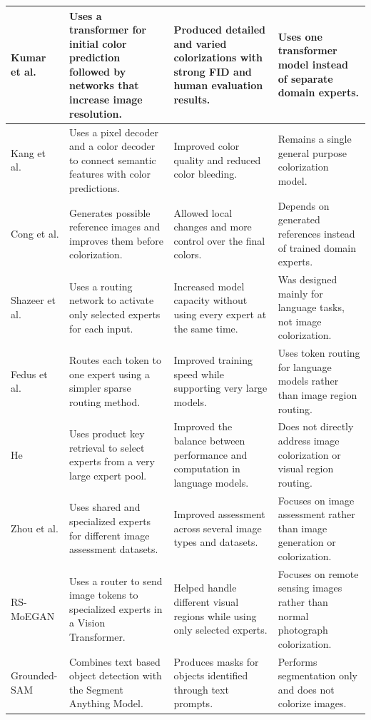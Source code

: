 \documentclass{FastFyp}
\begin{document}
\begin{longtable}{|p{2.5cm}|p{4.2cm}|p{4.2cm}|p{3.8cm}|}
\hline
Kumar et al. \cite{ref5} & Uses a transformer for initial color prediction followed by networks that increase image resolution. & Produced detailed and varied colorizations with strong FID and human evaluation results. & Uses one transformer model instead of separate domain experts. \\
\hline
Kang et al. \cite{ref9} & Uses a pixel decoder and a color decoder to connect semantic features with color predictions. & Improved color quality and reduced color bleeding. & Remains a single general purpose colorization model. \\
\hline
Cong et al. \cite{ref11} & Generates possible reference images and improves them before colorization. & Allowed local changes and more control over the final colors. & Depends on generated references instead of trained domain experts. \\
\hline
Shazeer et al. \cite{ref12} & Uses a routing network to activate only selected experts for each input. & Increased model capacity without using every expert at the same time. & Was designed mainly for language tasks, not image colorization. \\
\hline
Fedus et al. \cite{ref13} & Routes each token to one expert using a simpler sparse routing method. & Improved training speed while supporting very large models. & Uses token routing for language models rather than image region routing. \\
\hline
He \cite{ref14} & Uses product key retrieval to select experts from a very large expert pool. & Improved the balance between performance and computation in language models. & Does not directly address image colorization or visual region routing. \\
\hline
Zhou et al. \cite{ref15} & Uses shared and specialized experts for different image assessment datasets. & Improved assessment across several image types and datasets. & Focuses on image assessment rather than image generation or colorization. \\
\hline
RS-MoEGAN \cite{ref16} & Uses a router to send image tokens to specialized experts in a Vision Transformer. & Helped handle different visual regions while using only selected experts. & Focuses on remote sensing images rather than normal photograph colorization. \\
\hline
Grounded-SAM \cite{ref17} & Combines text based object detection with the Segment Anything Model. & Produces masks for objects identified through text prompts. & Performs segmentation only and does not colorize images. \\

\end{longtable}
\end{document}
